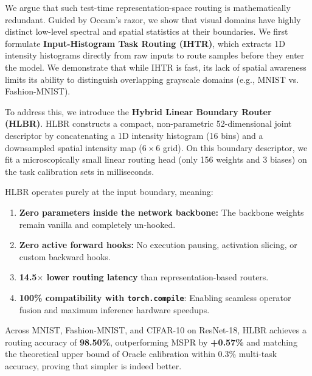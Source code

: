 \documentclass{article}
\theoremstyle{plain}
\theoremstyle{definition}
\theoremstyle{remark}
\begin{document}
We argue that such test-time representation-space routing is mathematically redundant. Guided by Occam's razor, we show that visual domains have highly distinct low-level spectral and spatial statistics at their boundaries. We first formulate \textbf{Input-Histogram Task Routing (IHTR)}, which extracts 1D intensity histograms directly from raw inputs to route samples before they enter the model. We demonstrate that while IHTR is fast, its lack of spatial awareness limits its ability to distinguish overlapping grayscale domains (e.g., MNIST vs. Fashion-MNIST).

To address this, we introduce the \textbf{Hybrid Linear Boundary Router (HLBR)}. HLBR constructs a compact, non-parametric 52-dimensional joint descriptor by concatenating a 1D intensity histogram (16 bins) and a downsampled spatial intensity map ($6\times 6$ grid). On this boundary descriptor, we fit a microscopically small linear routing head (only 156 weights and 3 biases) on the task calibration sets in milliseconds. 

HLBR operates purely at the input boundary, meaning:
\begin{enumerate}
    \item \textbf{Zero parameters inside the network backbone:} The backbone weights remain vanilla and completely un-hooked.
    \item \textbf{Zero active forward hooks:} No execution pausing, activation slicing, or custom backward hooks.
    \item \textbf{14.5$\times$ lower routing latency} than representation-based routers.
    \item \textbf{100\% compatibility with \texttt{torch.compile}}: Enabling seamless operator fusion and maximum inference hardware speedups.
\end{enumerate}

Across MNIST, Fashion-MNIST, and CIFAR-10 on ResNet-18, HLBR achieves a routing accuracy of \textbf{98.50\%}, outperforming MSPR by \textbf{+0.57\%} and matching the theoretical upper bound of Oracle calibration within 0.3\% multi-task accuracy, proving that simpler is indeed better.
\end{document}
